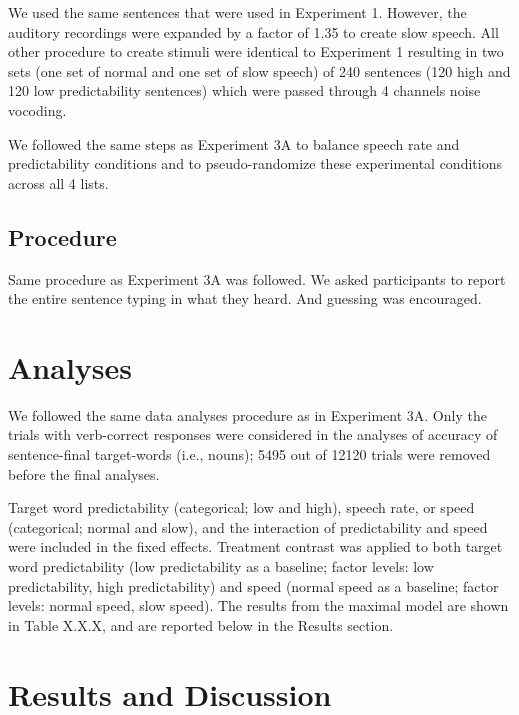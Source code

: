 \documentclass[a4paper, nobind]{templates/ociamthesis}
\begin{document}
We used the same sentences that were used in Experiment 1. However, the auditory recordings were expanded by a factor of 1.35 to create slow speech. All other procedure to create stimuli were identical to Experiment 1 resulting in two sets (one set of normal and one set of slow speech) of 240 sentences (120 high and 120 low predictability sentences) which were passed through 4 channels noise vocoding.

We followed the same steps as Experiment 3A to balance speech rate and predictability conditions and to pseudo-randomize these experimental conditions across all 4 lists.

\hypertarget{procedure-4}{%
\subsection{Procedure}\label{procedure-4}}

Same procedure as Experiment 3A was followed.
We asked participants to report the entire sentence typing in what they heard.
And guessing was encouraged.

\hypertarget{analyses-4}{%
\section{Analyses}\label{analyses-4}}

We followed the same data analyses procedure as in Experiment 3A.
Only the trials with verb-correct responses were considered in the analyses of accuracy of sentence-final target-words (i.e., nouns); 5495 out of 12120 trials were removed before the final analyses.

Target word predictability (categorical; low and high), speech rate, or speed (categorical; normal and slow), and the interaction of predictability and speed were included in the fixed effects.
Treatment contrast was applied to both target word predictability (low predictability as a baseline; factor levels: low predictability, high predictability) and speed (normal speed as a baseline; factor levels: normal speed, slow speed).
The results from the maximal model are shown in Table X.X.X, and are reported below in the Results section.

\hypertarget{results-and-discussion-3}{%
\section{Results and Discussion}\label{results-and-discussion-3}}
\end{document}

